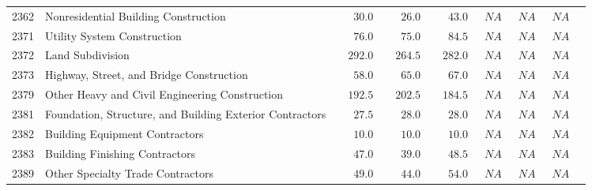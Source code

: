 \documentclass[9pt, oneside]{article}   	%
\begin{document}
\begin{longtable}{lp{3.5 in}ccccccc}
2362  & Nonresidential Building Construction & $\phantom{000}30.0$ & $\phantom{000}26.0$ & $\phantom{000}43.0$ & $\phantom{0}NA$ & $\phantom{0}NA$ & $\phantom{0}NA$ \\
2371  & Utility System Construction & $\phantom{000}76.0$ & $\phantom{000}75.0$ & $\phantom{000}84.5$ & $\phantom{0}NA$ & $\phantom{0}NA$ & $\phantom{0}NA$ \\
2372  & Land Subdivision & $\phantom{00}292.0$ & $\phantom{00}264.5$ & $\phantom{00}282.0$ & $\phantom{0}NA$ & $\phantom{0}NA$ & $\phantom{0}NA$ \\
2373  & Highway, Street, and Bridge Construction & $\phantom{000}58.0$ & $\phantom{000}65.0$ & $\phantom{000}67.0$ & $\phantom{0}NA$ & $\phantom{0}NA$ & $\phantom{0}NA$ \\
2379  & Other Heavy and Civil Engineering Construction & $\phantom{00}192.5$ & $\phantom{00}202.5$ & $\phantom{00}184.5$ & $\phantom{0}NA$ & $\phantom{0}NA$ & $\phantom{0}NA$ \\
2381  & Foundation, Structure, and Building Exterior Contractors & $\phantom{000}27.5$ & $\phantom{000}28.0$ & $\phantom{000}28.0$ & $\phantom{0}NA$ & $\phantom{0}NA$ & $\phantom{0}NA$ \\
2382  & Building Equipment Contractors & $\phantom{000}10.0$ & $\phantom{000}10.0$ & $\phantom{000}10.0$ & $\phantom{0}NA$ & $\phantom{0}NA$ & $\phantom{0}NA$ \\
2383  & Building Finishing Contractors & $\phantom{000}47.0$ & $\phantom{000}39.0$ & $\phantom{000}48.5$ & $\phantom{0}NA$ & $\phantom{0}NA$ & $\phantom{0}NA$ \\
2389  & Other Specialty Trade Contractors & $\phantom{000}49.0$ & $\phantom{000}44.0$ & $\phantom{000}54.0$ & $\phantom{0}NA$ & $\phantom{0}NA$ & $\phantom{0}NA$ \\


\end{longtable}
\end{document}
